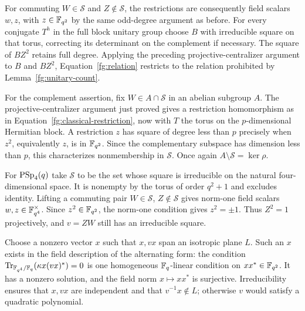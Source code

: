 For commuting $W\in\mathcal S$ and $Z\notin\mathcal S$, the
restrictions are consequently field scalars $w,z$, with
$z\in\mathbb F_{q^2}$ by the same odd-degree argument as before.
For every conjugate $T^h$ in the full block unitary group choose
$B$ with irreducible square on that torus, correcting its determinant
on the complement if necessary. The square of $BZ^2$ retains full
degree. Applying the preceding projective-centralizer argument
to $B$ and $BZ^2$, Equation~\eqref{fg:relation} restricts to
the relation prohibited by Lemma~\ref{fg:unitary-count}.

For the complement assertion, fix $W\in A\cap\mathcal S$ in an
abelian subgroup $A$. The projective-centralizer argument just proved
gives a restriction homomorphism as in
Equation~\eqref{fg:classical-restriction}, now with $T$ the torus on the
$p$-dimensional Hermitian block. A restriction $z$ has square of degree
less than $p$ precisely when $z^2$, equivalently $z$, is in
$\mathbb F_{q^2}$. Since the complementary subspace has dimension less than
$p$, this characterizes nonmembership in $\mathcal S$. Once again
$A\setminus\mathcal S=\ker\rho$.

For $\operatorname{PSp}_4(q)$ take $\mathcal S$ to be the set whose square is
irreducible on the natural four-dimensional space. It is nonempty
by the torus of order $q^2+1$ and excludes identity. Lifting a
commuting pair $W\in\mathcal S$, $Z\notin\mathcal S$ gives norm-one
field scalars $w,z\in\mathbb F_{q^4}^\times$. Since $z^2\in\mathbb F_{q^2}$,
the norm-one condition gives $z^2=\pm1$. Thus $Z^2=1$ projectively,
and $v=ZW$ still has an irreducible square.

Choose a nonzero vector $x$ such that $x,vx$ span an isotropic
plane $L$. Such an $x$ exists in the field description of the
alternating form: the condition
$\operatorname{Tr}_{\mathbb F_{q^4}/\mathbb F_q}(\kappa x(vx)^*)=0$ is one homogeneous
$\mathbb F_q$-linear condition on $xx^*\in\mathbb F_{q^2}$. It has a nonzero
solution, and the field norm $x\mapsto xx^*$ is surjective.
Irreducibility ensures that $x,vx$ are independent and that
$v^{-1}x\notin L$; otherwise $v$ would satisfy a quadratic polynomial.

